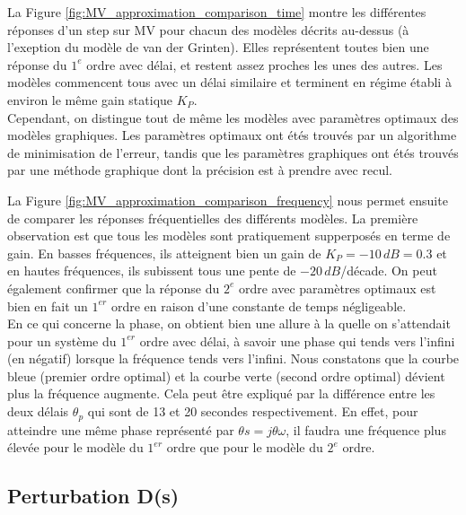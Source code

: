 \documentclass{article}
\begin{document}
La Figure \ref{fig:MV_approximation_comparison_time} montre les différentes réponses d'un step sur MV pour chacun des modèles décrits au-dessus (à l'exeption du modèle de van der Grinten).
Elles représentent toutes bien une réponse du $1^{e}$ ordre avec délai, et restent assez proches les unes des autres.
Les modèles commencent tous avec un délai similaire et terminent en régime établi à environ le même gain statique $K_P$.\\
Cependant, on distingue tout de même les modèles avec paramètres optimaux des modèles graphiques.
Les paramètres optimaux ont étés trouvés par un algorithme de minimisation de l'erreur, tandis que les paramètres graphiques ont étés trouvés par une méthode graphique dont la précision est à prendre avec recul.
\par
La Figure \ref{fig:MV_approximation_comparison_frequency} nous permet ensuite de comparer les réponses fréquentielles des différents modèles.
La première observation est que tous les modèles sont pratiquement supperposés en terme de gain.
En basses fréquences, ils atteignent bien un gain de $K_P = -10\,dB = 0.3$ et en hautes fréquences, ils subissent tous une pente de $-20\,dB$/décade.
On peut également confirmer que la réponse du $2^{e}$ ordre avec paramètres optimaux est bien en fait un $1^{er}$ ordre en raison d'une constante de temps négligeable.\\
En ce qui concerne la phase, on obtient bien une allure à la quelle on s'attendait pour un système du $1^{er}$ ordre avec délai, à savoir une phase qui tends vers l'infini (en négatif) lorsque la fréquence tends vers l'infini.
Nous constatons que la courbe bleue (premier ordre optimal) et la courbe verte (second ordre optimal) dévient plus la fréquence augmente. Cela peut être expliqué par la différence entre les deux délais $\theta_p$ qui sont de 13 et 20 secondes respectivement.
En effet, pour atteindre une même phase représenté par $\theta s = j\theta\omega$, il faudra une fréquence plus élevée pour le modèle du $1^{er}$ ordre que pour le modèle du $2^{e}$ ordre. 

\subsection{Perturbation D(s)}
\end{document}
